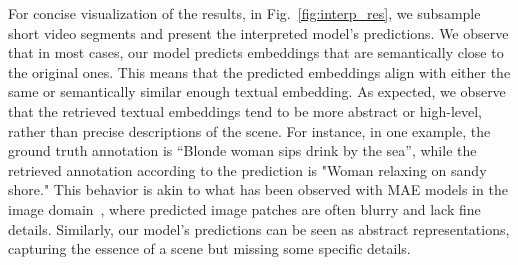 For concise visualization of the results, in Fig.~\ref{fig:interp_res}, we subsample short video segments and present the interpreted model's predictions. We observe that in most cases, our model predicts embeddings that are semantically close to the original ones. This means that the predicted embeddings align with either the same or semantically similar enough textual embedding. As expected, we observe that the retrieved textual embeddings tend to be more abstract or high-level, rather than precise descriptions of the scene. For instance, in one example, the ground truth annotation is ``Blonde woman sips drink by the sea'', while the retrieved annotation according to the prediction is "Woman relaxing on sandy shore." This behavior is akin to what has been observed with MAE models in the image domain~\cite{he2022masked}, where predicted image patches are often blurry and lack fine details. Similarly, our model’s predictions can be seen as abstract representations, capturing the essence of a scene but missing some specific details. 
